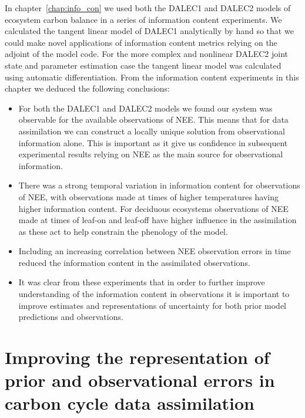 In chapter~\ref{chap:info_con} we used both the DALEC1 and DALEC2 models of ecosystem carbon balance in a series of information content experiments. We calculated the tangent linear model of DALEC1 analytically by hand so that we could make novel applications of information content metrics relying on the adjoint of the model code. For the more complex and nonlinear DALEC2 joint state and parameter estimation case the tangent linear model was calculated using automatic differentiation. From the information content experiments in this chapter we deduced the following conclusions:
\begin{itemize}
\item For both the DALEC1 and DALEC2 models we found our system was observable for the available observations of NEE. This means that for data assimilation we can construct a locally unique solution from observational information alone. This is important as it give us confidence in subsequent experimental results relying on NEE as the main source for observational information.
\item There was a strong temporal variation in information content for observations of NEE, with observations made at times of higher temperatures having higher information content. For deciduous ecosystems observations of NEE made at times of leaf-on and leaf-off have higher influence in the assimilation as these act to help constrain the phenology of the model. 
\item Including an increasing correlation between NEE observation errors in time reduced the information content in the assimilated observations. 
\item It was clear from these experiments that in order to further improve understanding of the information content in observations it is important to improve estimates and representations of uncertainty for both prior model predictions and observations.
\end{itemize}

\section{Improving the representation of prior and observational errors in carbon cycle data assimilation}

